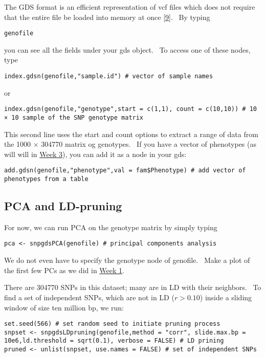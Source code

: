 \documentclass[
]{book}
\begin{document}
The GDS format is an efficient representation of vcf files which does not require that the entire file be loaded into memory at once {[}\protect\hyperlink{ref-zheng_high-performance_2012}{9}{]}.~ By typing

\begin{verbatim}
genofile
\end{verbatim}

you can see all the fields under your gds object.~ To access one of these nodes, type

\begin{verbatim}
index.gdsn(genofile,"sample.id") # vector of sample names
\end{verbatim}

or

\begin{verbatim}
index.gdsn(genofile,"genotype",start = c(1,1), count = c(10,10)) # 10 × 10 sample of the SNP genotype matrix
\end{verbatim}

This second line uses the start and count options to extract a range of data from the 1000 × 304770 matrix og genotypes.~ If you have a vector of phenotypes (as will will in \href{}{Week 3}), you can add it as a node in your gds:

\begin{verbatim}
add.gdsn(genofile,"phenotype",val = fam$Phenotype) # add vector of phenotypes from a table
\end{verbatim}

\hypertarget{pca-and-ld-pruning}{%
\subsection{PCA and LD-pruning}\label{pca-and-ld-pruning}}

For now, we can run PCA on the genotype matrix by simply typing

\begin{verbatim}
pca <- snpgdsPCA(genofile) # principal components analysis
\end{verbatim}

We do not even have to specify the genotype node of genofile.~ Make a plot of the first few PCs as we did in \href{}{Week 1}.

There are 304770 SNPs in this dataset; many are in LD with their neighbors.~ To find a set of independent SNPs, which are not in LD (\(r>0.10\)) inside a sliding window of size ten million bp, we run:

\begin{verbatim}
set.seed(566) # set random seed to initiate pruning process
snpset <- snpgdsLDpruning(genofile,method = "corr", slide.max.bp = 10e6,ld.threshold = sqrt(0.1), verbose = FALSE) # LD prining
pruned <- unlist(snpset, use.names = FALSE) # set of independent SNPs
\end{verbatim}
\end{document}
